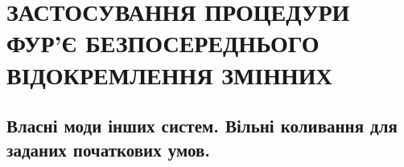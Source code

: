 \documentclass[a4paper, 14pt]{extreport}
\begin{document}
\setcounter{page}{2}

\chapter{ЗАСТОСУВАННЯ ПРОЦЕДУРИ ФУР’Є БЕЗПОСЕРЕДНЬОГО ВІДОКРЕМЛЕННЯ ЗМІННИХ}


%

\section{Власні моди інших систем. Вільні коливання для заданих початкових умов.}








\end{document}
